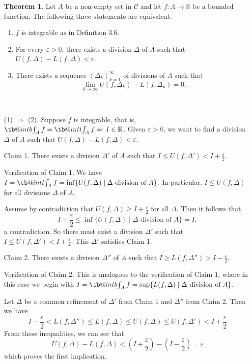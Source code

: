 \documentclass[11pt]{article}
\makeatletter
\theoremstyle{definition}
\newtheorem{thm}{Theorem}[section]
\newcommand{\R}{\ensuremath{\mathbb{R}}}
\newcommand\tint{\mathop{\mathpalette\tb@int{t}}\!\int}
\newcommand\bint{\mathop{\mathpalette\tb@int{b}}\!\int}
\newcommand\tb@int[2]{%
  \sbox\z@{$\m@th#1\int$}%
  \if#2t%
    \rlap{\hbox to\wd\z@{%
      \hfil
      \vrule width .35em height \dimexpr\ht\z@+1.4pt\relax depth -\dimexpr\ht\z@+1pt\relax
      \kern.05em %
    }}
  \else
    \rlap{\hbox to\wd\z@{%
      \vrule width .35em height -\dimexpr\dp\z@+1pt\relax depth \dimexpr\dp\z@+1.4pt\relax
      \hfil
    }}
  \fi
}
\newenvironment{pf}[1][\proofname]{\par
  \pushQED{\qed}%
  \normalfont \topsep0\p@\relax
  \trivlist
  \item[\hskip\labelsep\itshape
  #1\@addpunct{.}]\ignorespaces
}{%
  \popQED\endtrivlist\@endpefalse
}
\makeatother
\begin{document}
\begin{thm}
Let $A$ be a non-empty set in $\mathcal{C}$ and let $f : A \to \R$ be a bounded function. The following three statements are equivalent. \vspace{-1.5ex}
\begin{enumerate}[(1)]
\item $f$ is integrable as in Definition 3.6.
\item For every $\varepsilon > 0$, there exists a division $\Delta$ of $A$ such that $U(f, \Delta) - L(f, \Delta) < \varepsilon$.
\item There exists a sequence $(\Delta_k)_{k=1}^\infty$ of divisions of $A$ such that
$$\lim_{k\to\infty} U(f, \Delta_k) - L(f, \Delta_k) = 0.$$
\end{enumerate} 
\end{thm}
\begin{pf}~

(1) $\Rightarrow$ (2). Suppose $f$ is integrable, that is, $\bint_A f = \tint_A f =: I \in \R$. Given $\varepsilon > 0$, we want to find a division $\Delta$ of $A$ such that $U(f, \Delta) - L(f, \Delta) < \varepsilon$. 

{\sc Claim 1.} There exists a division $\Delta'$ of $A$ such that $I \leq U(f, \Delta') < I + \frac{\varepsilon}2$.

{\sc Verification of Claim 1.} We have $I = \tint_A f = \inf\{U(f, \Delta) \mid \Delta \text{ division of } A\}$. 
In particular, $I \leq U(f, \Delta)$ for all divisions $\Delta$ of $A$. 

Assume by contradiction that $U(f, \Delta) \geq I + \frac{\varepsilon}2$ for all $\Delta$. Then it follows that
$$I + \frac{\varepsilon}2 \leq \inf\{U(f, \Delta) \mid \Delta \text{ division of } A\} = I,$$
a contradiction. So there must exist a division $\Delta'$ such that $I \leq U(f, \Delta') < I + \frac{\varepsilon}2$. This $\Delta'$ satisfies Claim 1.

{\sc Claim 2.} There exists a division $\Delta''$ of $A$ such that $I \geq L(f, \Delta'') > I - \frac{\varepsilon}2$.

{\sc Verification of Claim 2.} This is analogous to the verification of Claim 1, where in this case we begin with $I = \bint_A f = \sup\{L(f, \Delta) \mid \Delta \text{ division of } A\}$. 

Let $\Delta$ be a common refinement of $\Delta'$ from Claim 1 and $\Delta''$ from Claim 2. Then we have
$$I - \frac{\varepsilon}2 < L(f, \Delta'') \leq L(f, \Delta) \leq U(f, \Delta) \leq U(f, \Delta') < I + \frac{\varepsilon}2$$
From these inequalities, we can see that
$$U(f, \Delta) - L(f, \Delta) < \left(I + \frac{\varepsilon}2\right) - \left(I - \frac{\varepsilon}2\right) = \varepsilon$$
which proves the first implication.


\end{pf}
\end{document}

